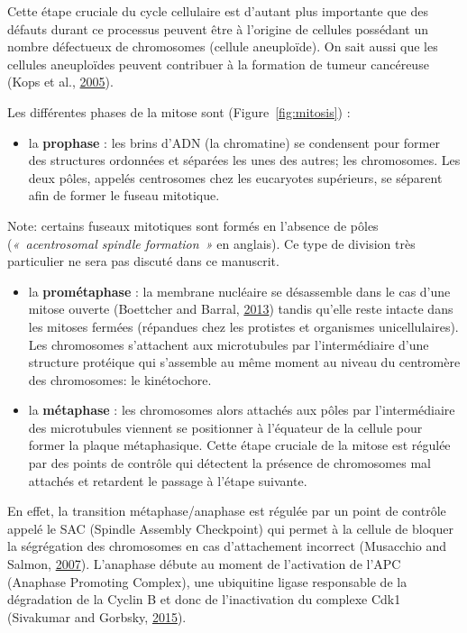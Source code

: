 \documentclass[12pt,a4paper,twoside,openright]{book}
\providecommand{\tightlist}{%
  \setlength{\itemsep}{0pt}\setlength{\parskip}{0pt}}
\begin{document}
Cette étape cruciale du cycle cellulaire est d'autant plus importante
que des défauts durant ce processus peuvent être à l'origine de cellules
possédant un nombre défectueux de chromosomes (cellule aneuploïde). On
sait aussi que les cellules aneuploïdes peuvent contribuer à la
formation de tumeur cancéreuse (Kops et al.,
\protect\hyperlink{ref-Kops2005}{2005}).

Les différentes phases de la mitose sont (Figure~\ref{fig:mitosis}) :

\begin{itemize}
\tightlist
\item
  la \textbf{prophase} : les brins d'ADN (la chromatine) se condensent
  pour former des structures ordonnées et séparées les unes des autres;
  les chromosomes. Les deux pôles, appelés centrosomes chez les
  eucaryotes supérieurs, se séparent afin de former le fuseau mitotique.
\end{itemize}

Note: certains fuseaux mitotiques sont formés en l'absence de pôles
(\emph{«~acentrosomal spindle formation~»} en anglais). Ce type de
division très particulier ne sera pas discuté dans ce manuscrit.

\begin{itemize}
\item
  la \textbf{prométaphase} : la membrane nucléaire se désassemble dans
  le cas d'une mitose ouverte (Boettcher and Barral,
  \protect\hyperlink{ref-Boettcher2013}{2013}) tandis qu'elle reste
  intacte dans les mitoses fermées (répandues chez les protistes et
  organismes unicellulaires). Les chromosomes s'attachent aux
  microtubules par l'intermédiaire d'une structure protéique qui
  s'assemble au même moment au niveau du centromère des chromosomes: le
  kinétochore.
\item
  la \textbf{métaphase} : les chromosomes alors attachés aux pôles par
  l'intermédiaire des microtubules viennent se positionner à l'équateur
  de la cellule pour former la plaque métaphasique. Cette étape cruciale
  de la mitose est régulée par des points de contrôle qui détectent la
  présence de chromosomes mal attachés et retardent le passage à l'étape
  suivante.
\end{itemize}

En effet, la transition métaphase/anaphase est régulée par un point de
contrôle appelé le SAC (Spindle Assembly Checkpoint) qui permet à la
cellule de bloquer la ségrégation des chromosomes en cas d'attachement
incorrect (Musacchio and Salmon,
\protect\hyperlink{ref-Musacchio2007}{2007}). L'anaphase débute au
moment de l'activation de l'APC (Anaphase Promoting Complex), une
ubiquitine ligase responsable de la dégradation de la Cyclin B et donc
de l'inactivation du complexe Cdk1 (Sivakumar and Gorbsky,
\protect\hyperlink{ref-Sivakumar2015}{2015}).
\end{document}
